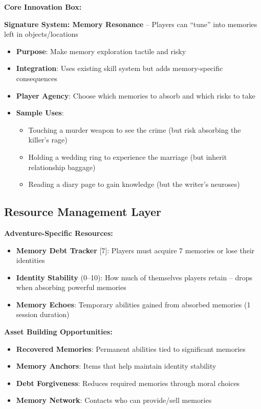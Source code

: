 \documentclass[11pt]{article}
\newenvironment{coreinnovation}{%
  \begin{mdframed}[backgroundcolor=gray!10, linewidth=0pt]
  \textbf{Core Innovation Box:}
}{%
  \end{mdframed}
}
\begin{document}
\begin{coreinnovation}
\textbf{Signature System: Memory Resonance} -- Players can ``tune'' into memories left in objects/locations
\begin{itemize}[leftmargin=*]
  \item \textbf{Purpose}: Make memory exploration tactile and risky
  \item \textbf{Integration}: Uses existing skill system but adds memory-specific consequences
  \item \textbf{Player Agency}: Choose which memories to absorb and which risks to take
  \item \textbf{Sample Uses}:
    \begin{itemize}
      \item Touching a murder weapon to see the crime (but risk absorbing the killer's rage)
      \item Holding a wedding ring to experience the marriage (but inherit relationship baggage)
      \item Reading a diary page to gain knowledge (but the writer's neuroses)
    \end{itemize}
\end{itemize}
\end{coreinnovation}

\subsection*{Resource Management Layer}

\textbf{Adventure-Specific Resources:}
\begin{itemize}[leftmargin=*]
  \item \textbf{Memory Debt Tracker} [7]: Players must acquire 7 memories or lose their identities
  \item \textbf{Identity Stability} (0--10): How much of themselves players retain -- drops when absorbing powerful memories
  \item \textbf{Memory Echoes}: Temporary abilities gained from absorbed memories (1 session duration)
\end{itemize}

\textbf{Asset Building Opportunities:}
\begin{itemize}[leftmargin=*]
  \item \textbf{Recovered Memories}: Permanent abilities tied to significant memories
  \item \textbf{Memory Anchors}: Items that help maintain identity stability
  \item \textbf{Debt Forgiveness}: Reduces required memories through moral choices
  \item \textbf{Memory Network}: Contacts who can provide/sell memories
\end{itemize}
\end{document}
